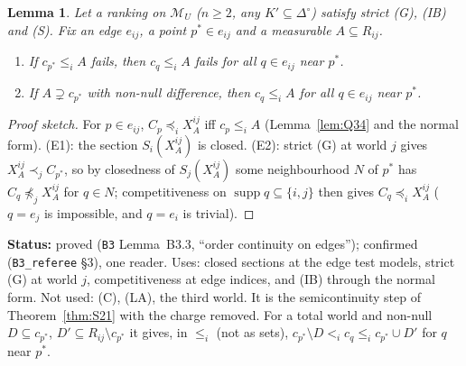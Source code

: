 \documentclass[11pt]{article}
\newtheorem{lemma}[theorem]{Lemma}
\theoremstyle{definition}
\theoremstyle{remark}
\newcommand{\Di}{\Delta^{\circ}}
\newcommand{\M}{\mathcal M}
\newcommand{\supp}{\operatorname{supp}}
\newcommand{\src}[1]{\texttt{#1}}
\newcommand{\status}[1]{\par\smallskip\noindent\textbf{Status:} #1\par\smallskip}
\begin{document}
\begin{lemma}\label{lem:B33}
Let a ranking on $\M_U$ ($n\ge2$, any $K'\subseteq\Di$) satisfy strict (G), (IB) and (S). Fix an edge $e_{ij}$, a point $p^*\in e_{ij}$ and a measurable $A\subseteq R_{ij}$.
\begin{enumerate}[leftmargin=*,label=(E\arabic*)]
\item If $c_{p^*}\le_iA$ fails, then $c_q\le_iA$ fails for all $q\in e_{ij}$ near $p^*$.
\item If $A\supsetneq c_{p^*}$ with non-null difference, then $c_q\le_iA$ for all $q\in e_{ij}$ near $p^*$.
\end{enumerate}
\end{lemma}
\begin{proof}[Proof sketch]
For $p\in e_{ij}$, $C_p\preceq_iX^{ij}_A$ iff $c_p\le_iA$ (Lemma~\ref{lem:Q34} and the normal form). (E1): the section $S_i(X^{ij}_A)$ is closed. (E2): strict (G) at world $j$ gives $X^{ij}_A\prec_jC_{p^*}$, so by closedness of $S_j(X^{ij}_A)$ some neighbourhood $N$ of $p^*$ has $C_q\not\preceq_jX^{ij}_A$ for $q\in N$; competitiveness on $\supp q\subseteq\{i,j\}$ then gives $C_q\preceq_iX^{ij}_A$ ($q=e_j$ is impossible, and $q=e_i$ is trivial).
\end{proof}
\status{proved (\src{B3} Lemma~B3.3, ``order continuity on edges''); confirmed (\src{B3\_referee} \S3), one reader. Uses: closed sections at the edge test models, strict (G) at world $j$, competitiveness at edge indices, and (IB) through the normal form. Not used: (C), (LA), the third world. It is the semicontinuity step of Theorem~\ref{thm:S21} with the charge removed. For a total world and non-null $D\subseteq c_{p^*}$, $D'\subseteq R_{ij}\setminus c_{p^*}$ it gives, in $\le_i$ (not as sets), $c_{p^*}\setminus D<_ic_q\le_ic_{p^*}\cup D'$ for $q$ near $p^*$.}
\end{document}
